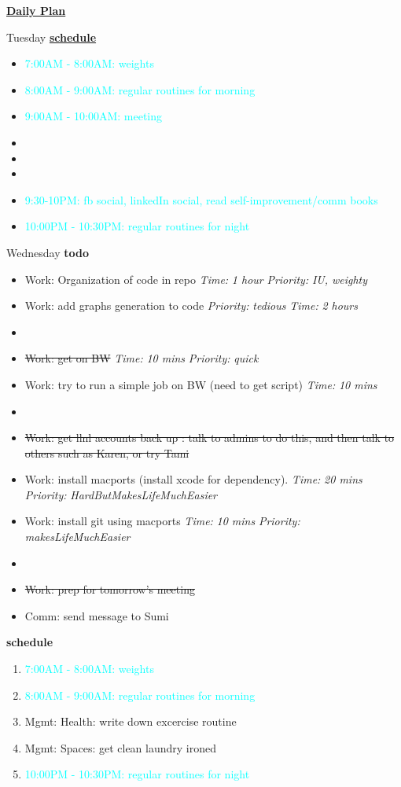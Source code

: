 \documentclass[serif,mathserif,final]{beamer}
\newcommand{\doneTask}[1]{\item \sout{#1}}
\newcommand{\timeEst}[1]{\textit{Time:} \textit{#1}}
\newcommand{\priority}[1]{\textit{Priority:} \textit{#1}}
\newcommand{\regItem}[1]{\item \textcolor{cyan}{#1}}
\begin{document}
\begin{frame}{}
\begin{columns}[t]
\begin{column}{0.27\linewidth}{\textbf{\underline{Daily Plan}}}
{\begin{block} {\small Tuesday}
\underline{\textbf{schedule}}\\
\begin{itemize}
\regItem{7:00AM - 8:00AM: weights}
\regItem{8:00AM - 9:00AM: regular routines for morning}
\regItem{9:00AM - 10:00AM: meeting} 
\item \tiny 
\item \tiny 
\item \tiny 
\regItem{9:30-10PM: fb social, linkedIn social, read self-improvement/comm books}
\regItem{10:00PM - 10:30PM: regular routines for night} 
\end{itemize} 
\end{block} 


\begin{block} {\small Wednesday}
\textbf{todo} \\
  \begin{itemize} 
  \item \tiny Work: Organization of code in repo \timeEst{1 hour} \priority{IU, weighty} 
  \item \tiny Work: add graphs generation to code  \priority{tedious} \timeEst{2 hours} 
    
  \item \tiny \doneTask{Work: get on BW} \timeEst{10 mins} \priority{quick} 
  \item \tiny Work: try to run a simple job on BW (need to get script) \timeEst{10 mins} 
  \item \tiny \doneTask{Work: get llnl accounts back up : talk to admins to do this, and then talk to others such as Karen, or try Tami} 
 
  \item \tiny Work: install macports (install xcode for dependency). \timeEst{20 mins} \priority{HardButMakesLifeMuchEasier} 
  \item \tiny Work: install git using macports \timeEst{10 mins} \priority{makesLifeMuchEasier} 

  \item \tiny \doneTask {Work: prep for tomorrow's meeting } 
  \item \tiny Comm: send message to Sumi 
  \end{itemize} 

\textbf{schedule} \\
  \begin{enumerate} 
    \regItem{7:00AM - 8:00AM: weights}
    \regItem{8:00AM - 9:00AM: regular routines for morning}
  \item \tiny Mgmt: Health: write down excercise routine 
  \item \tiny Mgmt: Spaces: get clean laundry ironed
    \regItem{10:00PM - 10:30PM: regular routines for night}
  \end{enumerate} 
\end{block} 



}
\end{column}
\end{columns}
\end{frame}
\end{document}

